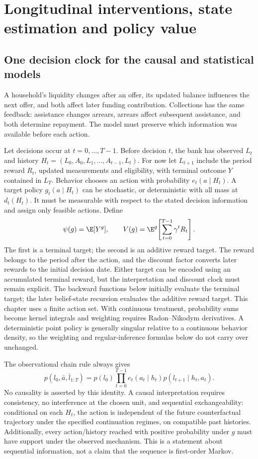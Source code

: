 \chapter{Longitudinal interventions, state estimation and policy value}
\label{r3:longitudinal}
\section{One decision clock for the causal and statistical models}
A household's liquidity changes after an offer, its updated balance
influences the next offer, and both affect later funding contribution.
Collections has the same feedback: assistance changes arrears, arrears
affect subsequent assistance, and both determine repayment. The model
must preserve which information was available before each action.

Let decisions occur at $t=0,\ldots,T-1$. Before decision $t$, the bank
has observed $L_t$ and history
$H_t=(L_0,A_0,L_1,\ldots,A_{t-1},L_t)$. For now let $L_{t+1}$ include
the period reward $R_t$, updated measurements and eligibility, with
terminal outcome $Y$ contained in $L_T$. Behavior chooses an action with
probability $e_t(a\mid H_t)$. A target policy $g_t(a\mid H_t)$ can be
stochastic, or deterministic with all mass at $d_t(H_t)$. It must be
measurable with respect to the stated decision information and assign
only feasible actions. Define
\[
 \psi(g)=\E[Y^g],\qquad
 V(g)=\E^g\!\left[\sum_{t=0}^{T-1}\gamma^tR_t\right].
\]
The first is a terminal target; the second is an additive reward target.
The reward belongs to the period after the action, and the discount factor
converts later rewards to the initial decision date. Either target can be
encoded using an accumulated terminal reward, but the interpretation and
discount clock must remain explicit. The backward functions below initially
evaluate the terminal target; the later belief-state recursion evaluates
the additive reward target.
This chapter uses a finite action set. With continuous treatment,
probability sums become kernel integrals and weighting requires
Radon--Nikodym derivatives. A deterministic point policy is generally
singular relative to a continuous behavior density, so the weighting
and regular-inference formulas below do not carry over unchanged.

The observational chain rule always gives
\begin{equation}
 p(l_0,\bar a,\bar l_{1:T})
 =p(l_0)\prod_{t=0}^{T-1}e_t(a_t\mid h_t)
                              p(l_{t+1}\mid h_t,a_t).
 \label{r3:observed-sequence}
\end{equation}
No causality is asserted by this identity. A causal interpretation
requires consistency, no interference at the chosen unit, and sequential
exchangeability: conditional on each $H_t$, the action is independent of
the future counterfactual trajectory under the specified continuation
regimes, on compatible past histories. Additionally, every action/history
reached with positive probability under $g$ must have support under the
observed mechanism. This is a statement about sequential information,
not a claim that the sequence is first-order Markov.

